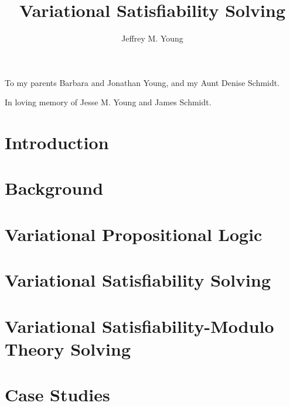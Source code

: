 \documentclass[submission]{beavtex}
\title{Variational Satisfiability Solving}
\author{Jeffrey M. Young}
\begin{document}
\maketitle

\mainmatter{}


\begin{dedication*}
  To my parents Barbara and Jonathan Young, and my Aunt Denise Schmidt.

  In loving memory of Jesse M. Young and James Schmidt.
\end{dedication*}

\setcounter{page}{1}
\chapter{Introduction}


\chapter{Background}


\chapter{Variational Propositional Logic}


\chapter{Variational Satisfiability Solving}


\chapter{Variational Satisfiability-Modulo Theory Solving}


\chapter{Case Studies}

\end{document}
